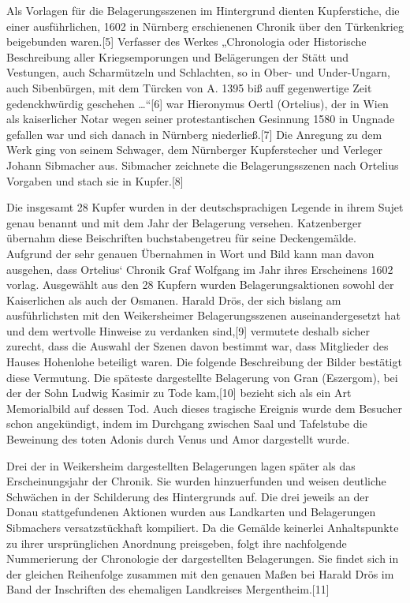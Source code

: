 \documentclass[
  letterpaper,
]{book}
\begin{document}
Als Vorlagen für die Belagerungsszenen im Hintergrund dienten
Kupferstiche, die einer ausführlichen, 1602 in Nürnberg erschienenen
Chronik über den Türkenkrieg beigebunden waren.{[}5{]} Verfasser des
Werkes „Chronologia oder Historische Beschreibung aller Kriegsemporungen
und Belägerungen der Stätt und Vestungen, auch Scharmützeln und
Schlachten, so in Ober- und Under-Ungarn, auch Sibenbürgen, mit dem
Türcken von A. 1395 biß auff gegenwertige Zeit gedenckhwürdig geschehen
\ldots``{[}6{]} war Hieronymus Oertl (Ortelius), der in Wien als
kaiserlicher Notar wegen seiner protestantischen Gesinnung 1580 in
Ungnade gefallen war und sich danach in Nürnberg niederließ.{[}7{]} Die
Anregung zu dem Werk ging von seinem Schwager, dem Nürnberger
Kupferstecher und Verleger Johann Sibmacher aus. Sibmacher zeichnete die
Belagerungsszenen nach Ortelius Vorgaben und stach sie in Kupfer.{[}8{]}

Die insgesamt 28 Kupfer wurden in der deutschsprachigen Legende in ihrem
Sujet genau benannt und mit dem Jahr der Belagerung versehen.
Katzenberger übernahm diese Beischriften buchstabengetreu für seine
Deckengemälde. Aufgrund der sehr genauen Übernahmen in Wort und Bild
kann man davon ausgehen, dass Ortelius` Chronik Graf Wolfgang im Jahr
ihres Erscheinens 1602 vorlag. Ausgewählt aus den 28 Kupfern wurden
Belagerungsaktionen sowohl der Kaiserlichen als auch der Osmanen. Harald
Drös, der sich bislang am ausführlichsten mit den Weikersheimer
Belagerungsszenen auseinandergesetzt hat und dem wertvolle Hinweise zu
verdanken sind,{[}9{]} vermutete deshalb sicher zurecht, dass die
Auswahl der Szenen davon bestimmt war, dass Mitglieder des Hauses
Hohenlohe beteiligt waren. Die folgende Beschreibung der Bilder
bestätigt diese Vermutung. Die späteste dargestellte Belagerung von Gran
(Eszergom), bei der der Sohn Ludwig Kasimir zu Tode kam,{[}10{]} bezieht
sich als ein Art Memorialbild auf dessen Tod. Auch dieses tragische
Ereignis wurde dem Besucher schon angekündigt, indem im Durchgang
zwischen Saal und Tafelstube die Beweinung des toten Adonis durch Venus
und Amor dargestellt wurde.

Drei der in Weikersheim dargestellten Belagerungen lagen später als das
Erscheinungsjahr der Chronik. Sie wurden hinzuerfunden und weisen
deutliche Schwächen in der Schilderung des Hintergrunds auf. Die drei
jeweils an der Donau stattgefundenen Aktionen wurden aus Landkarten und
Belagerungen Sibmachers versatzstückhaft kompiliert. Da die Gemälde
keinerlei Anhaltspunkte zu ihrer ursprünglichen Anordnung preisgeben,
folgt ihre nachfolgende Nummerierung der Chronologie der dargestellten
Belagerungen. Sie findet sich in der gleichen Reihenfolge zusammen mit
den genauen Maßen bei Harald Drös im Band der Inschriften des ehemaligen
Landkreises Mergentheim.{[}11{]}
\end{document}

